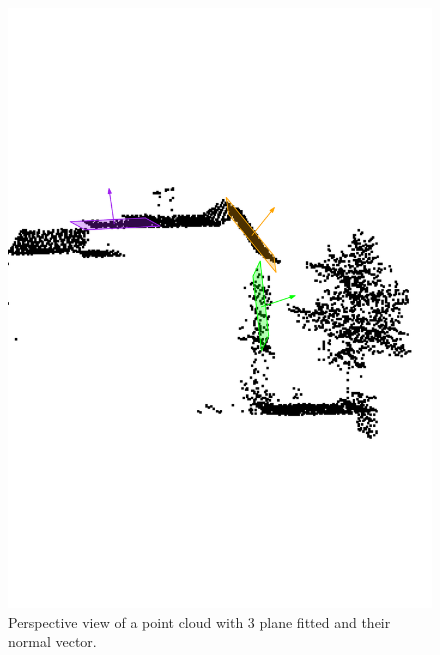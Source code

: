 \begin{figure}
  \centering
  \includegraphics[width=\linewidth]{normal_demo.pdf}
  \caption{Perspective view of a point cloud with 3 plane fitted and their normal vector.}%
\label{fig:normal_demo}
\end{figure}

%


